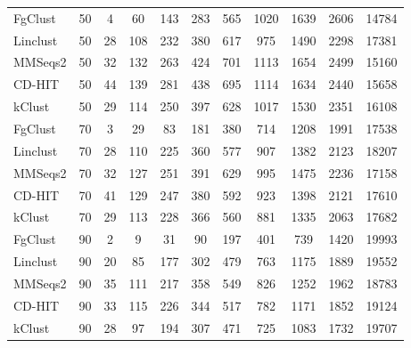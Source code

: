 \documentclass[11pt,letterpaper]{article}
\begin{document}
\begin{table}[t]
\begin{tabular}{l c c c c c c c c c c}
		FgClust & 50 & 4 & 60 & 143 & 283 & 565 & 1020 & 1639 & 2606 & 14784 \\
		Linclust & 50 & 28 & 108 & 232 & 380 & 617 & 975 & 1490 & 2298 & 17381 \\
		MMSeqs2 & 50 & 32 & 132 & 263 & 424 & 701 & 1113 & 1654 & 2499 & 15160 \\
		CD-HIT & 50 & 44 & 139 & 281 & 438 & 695 & 1114 & 1634 & 2440 & 15658 \\
		kClust & 50 & 29 & 114 & 250 & 397 & 628 & 1017 & 1530 & 2351 & 16108 \\
		\noalign{\vskip 2mm} 
		FgClust & 70 & 3 & 29 & 83 & 181 & 380 & 714 & 1208 & 1991 & 17538 \\
		Linclust & 70 & 28 & 110 & 225 & 360 & 577 & 907 & 1382 & 2123 & 18207 \\
		MMSeqs2 & 70 & 32 & 127 & 251 & 391 & 629 & 995 & 1475 & 2236 & 17158 \\
		CD-HIT & 70 & 41 & 129 & 247 & 380 & 592 & 923 & 1398 & 2121 & 17610 \\
		kClust & 70 & 29 & 113 & 228 & 366 & 560 & 881 & 1335 & 2063 & 17682 \\
		\noalign{\vskip 2mm} 
		FgClust & 90 & 2 & 9 & 31 & 90 & 197 & 401 & 739 & 1420 & 19993 \\
		Linclust & 90 & 20 & 85 & 177 & 302 & 479 & 763 & 1175 & 1889 & 19552 \\
		MMSeqs2 & 90 & 35 & 111 & 217 & 358 & 549 & 826 & 1252 & 1962 & 18783 \\
		CD-HIT & 90 & 33 & 115 & 226 & 344 & 517 & 782 & 1171 & 1852 & 19124 \\
		kClust & 90 & 28 & 97 & 194 & 307 & 471 & 725 & 1083 & 1732 & 19707 \\
		
		\bottomrule
	\end{tabular}
	\label{table:pdb-appendix}
\end{table}
\end{document}
